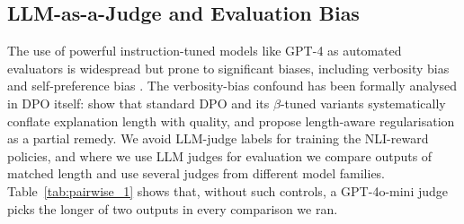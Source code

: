 \subsection{LLM-as-a-Judge and Evaluation Bias}
The use of powerful instruction-tuned models like GPT-4 as automated evaluators \citep{zheng2024judging} is widespread but prone to significant biases, including verbosity bias \citep{wang2023large} and self-preference bias \citep{pan2024evalbias}. The verbosity-bias confound has been formally analysed in DPO itself: \citep{park2024lengthbias} show that standard DPO and its $\beta$-tuned variants \citep{park2024betadpo} systematically conflate explanation length with quality, and propose length-aware regularisation as a partial remedy. We avoid LLM-judge labels for training the NLI-reward policies, and where we use LLM judges for evaluation we compare outputs of matched length and use several judges from different model families. Table~\ref{tab:pairwise_1} shows that, without such controls, a GPT-4o-mini judge picks the longer of two outputs in every comparison we ran.
